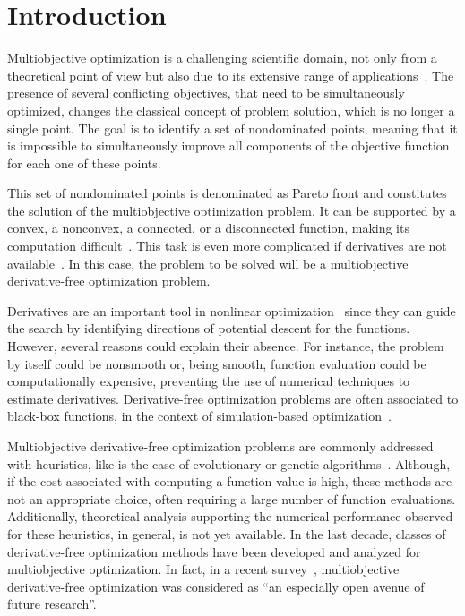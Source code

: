 \documentclass[12pt]{article}
\begin{document}
\section{Introduction}
\label{sec:int}
Multiobjective optimization is a challenging scientific domain,
not only from a theoretical point of view but also due to its
extensive range of
applications~\cite{brito2022,AHabiba_et_al_2022,FMoleiro_et_al_2021,YXing_et_al_2023}.
The presence of several conflicting objectives, that need to be
simultaneously optimized, changes the classical concept of problem
solution, which is no longer a single point. The goal is to
identify a set of nondominated points, meaning that it is
impossible to simultaneously improve all components of the
objective function for each one of these points.

This set of nondominated points is denominated as Pareto front and
constitutes the solution of the multiobjective optimization
problem. It can be supported by a convex, a nonconvex, a
connected, or a disconnected function, making its computation
difficult~\cite{miettinen1998,wiecek2016}. This task is even more
complicated if derivatives are not
available~\cite{audet2017,conn2009}. In this case, the problem to
be solved will be a multiobjective derivative-free optimization
problem.

Derivatives are an important tool in nonlinear
optimization~\cite{nocedal2006} since they can guide the search by
identifying directions of potential descent for the functions.
However, several reasons could explain their absence. For
instance, the problem by itself could be nonsmooth or, being
smooth, function evaluation could be computationally expensive,
preventing the use of numerical techniques to estimate
derivatives. Derivative-free optimization problems are often
associated to black-box functions, in the context of
simulation-based optimization~\cite{audet2017,conn2009}.

Multiobjective derivative-free optimization problems are commonly
addressed with heuristics, like is the case of evolutionary or
genetic algorithms~\cite{branke2008}. Although, if the cost
associated with computing a function value is high, these methods
are not an appropriate choice, often requiring a large number of
function evaluations. Additionally, theoretical analysis
supporting the numerical performance observed for these
heuristics, in general, is not yet available. In the last decade,
classes of derivative-free optimization methods have been
developed and analyzed for multiobjective optimization. In fact,
in a recent survey~\cite{larson2019}, multiobjective
derivative-free optimization was considered as ``an especially
open avenue of future research''.
\end{document}
